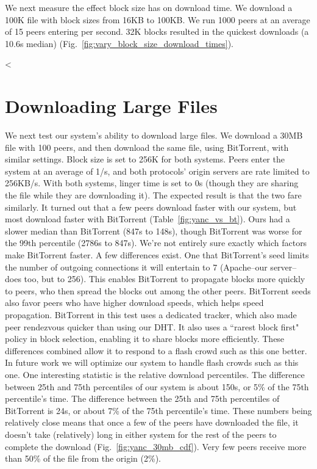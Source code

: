 We next measure the effect block size has on download time. We download a 100K file with block sizes from 
16KB to 100KB. We run 1000 peers at an average of 15 peers entering per second. 32K blocks resulted 
in the quickest downloads (a 10.6s median) (Fig.~\ref{fig:vary_block_size_download_times}). 


<%

\section{Downloading Large Files}

We next test our system's ability to download large files. We download a 30MB file with 100 peers, 
and then download the same file, using BitTorrent, with similar 
settings. Block size is set to 256K for both systems. Peers enter the system at an average of 1/s, 
and both protocols' origin servers are rate limited to 256KB/s. With both systems, linger time 
is set to 0s (though they are sharing the file while they are downloading it). 
The expected result is that the two fare similarly. It turned out that a few peers download 
faster with our system, but most download faster with BitTorrent (Table~\ref{fig:yanc_vs_bt}). 
Ours had a slower median than BitTorrent (847s to 148s), though BitTorrent was worse for the 99th 
percentile (2786s to 847s). We're not entirely sure exactly which factors make BitTorrent faster.
A few differences exist.  One that BitTorrent's seed limits the number of outgoing connections it will 
entertain to 7 (Apache--our server--does too, but to 256). This enables BitTorrent to propagate blocks more 
quickly to peers, who then spread the blocks out among the other peers. BitTorrent seeds also favor peers who have higher download 
speeds, which helps speed propagation. BitTorrent in this test uses a dedicated tracker, 
which also made peer rendezvous quicker than using our DHT.  It also uses a ``rarest block first" policy in block 
selection, enabling it to share blocks more efficiently.  These differences combined allow it 
to respond to a flash crowd such as this one better.  In future work we will optimize our system to handle 
flash crowds such as this one.  One interesting statistic is the relative download percentiles. 
The difference between 25th and 75th percentiles of our system is about 150s, 
or 5\% of the 75th percentile's time. The difference between the 25th and 75th percentiles of BitTorrent 
is 24s, or about 7\% of the 75th percentile's time. These numbers being relatively close means that once 
a few of the peers have downloaded the file, it doesn't take (relatively) long in either system for the rest of the peers to complete 
the download (Fig.~\ref{fig:yanc_30mb_cdf}). Very few peers receive more than 50\% of the file 
from the origin (2\%). 

